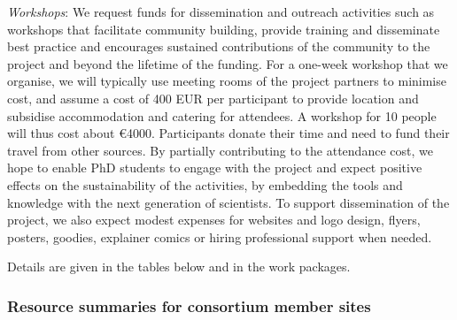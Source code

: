 \label{sect:budget-outreach-workshops}
\emph{Workshops}: We request funds for dissemination and outreach
activities such as workshops that facilitate community building,
provide training and disseminate best practice and encourages
sustained contributions of the community to the project and beyond the
lifetime of the funding. For a one-week workshop that we organise,
we will typically use meeting rooms of the project partners to minimise
cost, and assume a cost of 400 EUR per participant to provide location
and subsidise accommodation and catering for attendees. A workshop for 10 people
will thus cost about \euro{4000}. Participants
donate their time and need to fund their travel from other sources. By
partially contributing to the attendance cost, we hope to enable PhD
students to engage with the project and expect positive effects on the
sustainability of the activities, by embedding the tools and knowledge
with the next generation of scientists.
To support dissemination of the project, we also expect modest
expenses for websites and logo design, flyers, posters, goodies, explainer
comics or hiring professional support when needed.

Details are given in the tables below and in the work packages.

\bigskip



 \subsubsection{Resource summaries for consortium member sites}
 \label{resources.summary}

